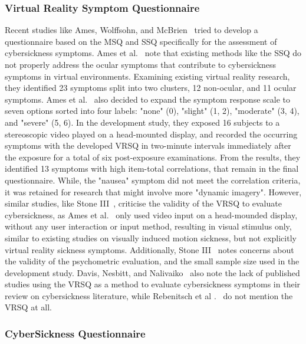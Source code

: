 \subsubsection{Virtual Reality Symptom Questionnaire}

Recent studies like Ames, Wolffsohn, and McBrien~\cite{Ames2005} tried to develop a questionnaire based on the MSQ
and SSQ specifically for the assessment of cybersickness symptoms.
Ames et al.~\cite{Ames2005} note that existing methods like the SSQ do not properly address the ocular symptoms that
contribute to cybersickness symptoms in virtual environments.
Examining existing virtual reality research, they identified 23 symptoms split into two clusters, 12 non-ocular, and
11 ocular symptoms.
Ames et al.~\cite{Ames2005} also decided to expand the symptom response scale to seven options sorted into four
labels: "none" (0), "slight" (1, 2), "moderate" (3, 4), and "severe" (5, 6).
In the development study, they exposed 16 subjects to a stereoscopic video played on a
head-mounted display, and recorded the occurring symptoms with the developed VRSQ in two-minute
intervals immediately after the exposure for a total of six post-exposure examinations.
From the results, they identified 13 symptoms with high item-total correlations, that remain in the final
questionnaire.
While, the "nausea" symptom did not meet the correlation criteria, it was retained for research that might involve
more "dynamic imagery".
However, similar studies, like Stone III~\cite{Stone2017}, criticise the validity of the VRSQ to evaluate
cybersickness, as Ames et al.~\cite{Ames2005} only used video input on a head-mounded display, without any user
interaction or input method, resulting in visual stimulus only, similar to existing studies on visually induced motion
sickness, but not explicitly virtual reality sickness symptoms.
Additionally, Stone III~\cite{Stone2017} notes concerns about the validity of the psychometric evaluation, and the
small sample size used in the development study.
Davis, Nesbitt, and Nalivaiko~\cite{Davis2014} also note the lack of published studies using the VRSQ as a method to
evaluate cybersickness symptoms in their review on cybersickness literature, while Rebenitsch et al
.~\cite{Rebenitsch2016} do not mention the VRSQ at all.

\subsubsection{CyberSickness Questionnaire}

